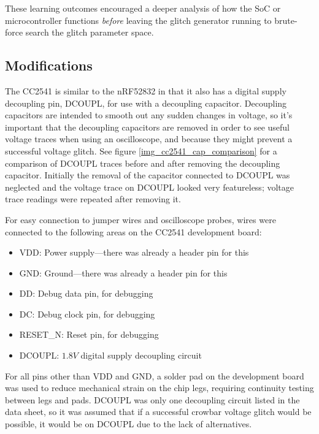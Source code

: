 These learning outcomes encouraged a deeper analysis of how the SoC or
microcontroller functions \emph{before} leaving the glitch generator
running to brute-force search the glitch parameter space.

\hypertarget{modifications-1}{%
\subsection{Modifications}\label{modifications-1}}

The CC2541 is similar to the nRF52832 in that it also has a digital
supply decoupling pin, DCOUPL, for use with a decoupling capacitor.
Decoupling capacitors are intended to smooth out any sudden changes in
voltage, so it's important that the decoupling capacitors are removed in
order to see useful voltage traces when using an oscilloscope, and
because they might prevent a successful voltage glitch. See figure
\ref{img_cc2541_cap_comparison} for a comparison of DCOUPL traces before
and after removing the decoupling capacitor. Initially the removal of
the capacitor connected to DCOUPL was neglected and the voltage trace on
DCOUPL looked very featureless; voltage trace readings were repeated
after removing it.

For easy connection to jumper wires and oscilloscope probes, wires were
connected to the following areas on the CC2541 development board:

\begin{itemize}
\tightlist
\item
  VDD: Power supply---there was already a header pin for this
\item
  GND: Ground---there was already a header pin for this
\item
  DD: Debug data pin, for debugging
\item
  DC: Debug clock pin, for debugging
\item
  RESET\_N: Reset pin, for debugging
\item
  DCOUPL: \(1.8V\) digital supply decoupling circuit
\end{itemize}

For all pins other than VDD and GND, a solder pad on the development
board was used to reduce mechanical strain on the chip legs, requiring
continuity testing between legs and pads. DCOUPL was only one decoupling
circuit listed in the data sheet, so it was assumed that if a successful
crowbar voltage glitch would be possible, it would be on DCOUPL due to
the lack of alternatives.

